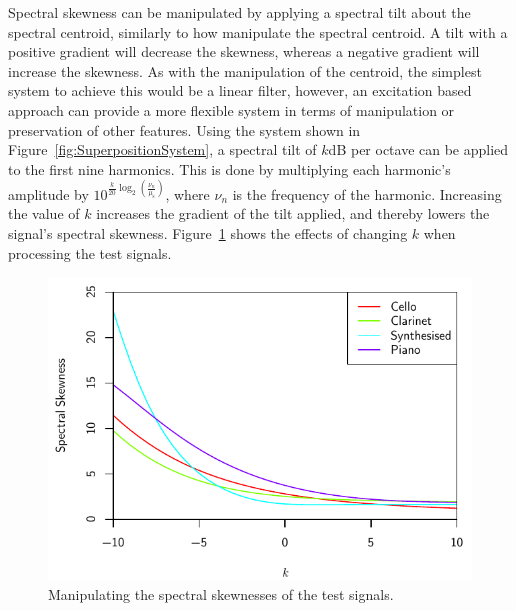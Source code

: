 			Spectral skewness can be manipulated by applying a spectral tilt about the spectral centroid,
			similarly to how \citet{williams2007perceptually} manipulate the spectral centroid. A tilt with a
			positive gradient will decrease the skewness, whereas a negative gradient will increase the
			skewness. As with the manipulation of the centroid, the simplest system to achieve this would be a
			linear filter, however, an excitation based approach can provide a more flexible system in terms of
			manipulation or preservation of other features. Using the system shown in
			Figure~\ref{fig:SuperpositionSystem}, a spectral tilt of $k$dB per octave can be applied to the
			first nine harmonics. This is done by multiplying each harmonic's amplitude by
			$10^{\frac{k}{20}\log_{2} \left( \frac{\nu_{n}}{\mu_{\mathrm{s}}} \right)}$, where $\nu_{n}$ is the
			frequency of the harmonic. Increasing the value of $k$ increases the gradient of the tilt applied,
			and thereby lowers the signal's spectral skewness.  Figure~\ref{fig:MoveSkewnesses} shows the
			effects of changing $k$ when processing the test signals.

			\begin{figure}[h!]
				\centering
				\includegraphics{chapter6/Images/MoveSkewnesses.pdf}
				\caption{Manipulating the spectral skewnesses of the test signals.}
				\label{fig:MoveSkewnesses}
			\end{figure}

